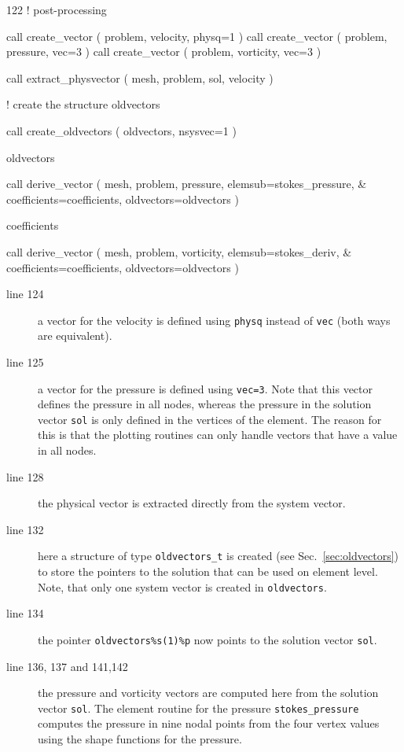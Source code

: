 \begin{listing}{122}
! post-processing
                                                                                
  call create_vector ( problem, velocity, physq=1 )
  call create_vector ( problem, pressure, vec=3 )
  call create_vector ( problem, vorticity, vec=3 )
                                                                                
  call extract_physvector ( mesh, problem, sol, velocity )

! create the structure oldvectors

  call create_oldvectors ( oldvectors, nsysvec=1 )

  oldvectors%

  call derive_vector ( mesh, problem, pressure, elemsub=stokes_pressure, &
    coefficients=coefficients, oldvectors=oldvectors )

  coefficients%

  call derive_vector ( mesh, problem, vorticity, elemsub=stokes_deriv, &
    coefficients=coefficients, oldvectors=oldvectors )
                                                                                
\end{listing}
\begin{description}
   \item[line 124] a vector for the velocity is defined using
     \texttt{physq} instead of \texttt{vec} (both ways are equivalent).
   \item[line 125] a vector for the pressure is defined using \texttt{vec=3}.
Note that this vector defines the pressure in all nodes, whereas the pressure
in the solution vector \texttt{sol} is only defined in the vertices of the
element. The reason for this is that the plotting routines can only handle
vectors that have a value in all nodes.
   \item[line 128] the physical vector is extracted directly from the
     system vector.
   \item[line 132] here a structure of type \texttt{oldvectors\_t} is created
(see Sec.~\ref{sec:oldvectors}) to store the pointers to the solution that can
be used on element level. Note, that only one system vector is created in
\texttt{oldvectors}.
   \item[line 134] the pointer \texttt{oldvectors\%s(1)\%p} now points to
the solution vector \texttt{sol}.
   \item[line 136, 137 and 141,142] the pressure and vorticity vectors are
     computed here from the solution vector \texttt{sol}.
    The element routine for the
pressure \texttt{stokes\_pressure} computes the pressure in nine nodal points
from the four vertex values using the shape functions for the pressure.
\end{description}
